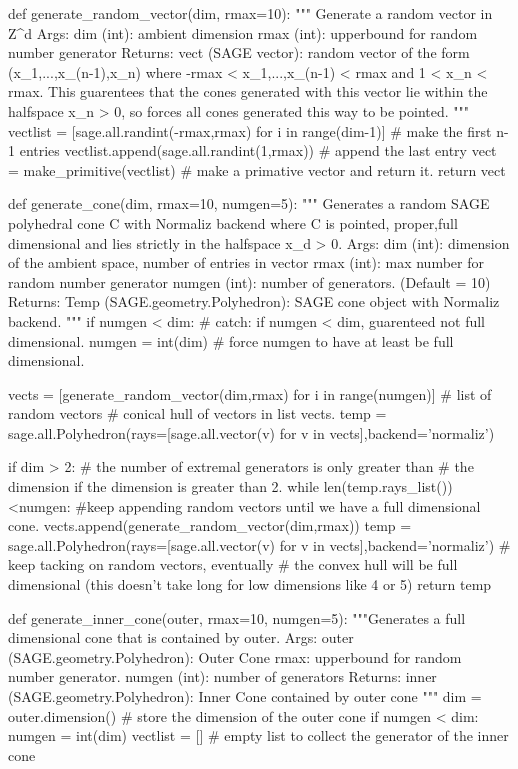 \documentclass{TC}
\begin{document}
\begin{SAGE}
def generate_random_vector(dim, rmax=10):
	""" Generate a random vector in Z^d
	Args:
		dim (int): ambient dimension
		rmax (int): upperbound for random number generator
	Returns:
		vect (SAGE vector): random vector of the form (x_1,...,x_(n-1),x_n)
		where -rmax < x_1,...,x_(n-1) < rmax
		and 1 < x_n < rmax.
		This guarentees that the cones generated with this vector lie within
		the halfspace x_n > 0, so forces all cones generated this way to be pointed.
	"""
	vectlist  = [sage.all.randint(-rmax,rmax) for i in range(dim-1)]
	# make the first n-1 entries
	vectlist.append(sage.all.randint(1,rmax))
	# append the last entry  
	vect = make_primitive(vectlist) 
	# make a primative vector and return it.
	return vect

def generate_cone(dim, rmax=10, numgen=5):
	""" Generates a random SAGE polyhedral cone C with Normaliz backend
	where C is pointed, proper,full dimensional and lies strictly in 
	the halfspace x_d > 0.
	Args:
		dim (int): dimension of the ambient space, number of entries in vector
		rmax (int): max number for random number generator
		numgen (int): number of generators. (Default = 10)
	Returns:
		Temp (SAGE.geometry.Polyhedron): SAGE cone object with Normaliz backend. 
	"""
	if numgen < dim: 			# catch: if numgen < dim, guarenteed not full dimensional. 
		numgen = int(dim)  		# force numgen to have at least be full dimensional.

	vects = [generate_random_vector(dim,rmax) for i in range(numgen)] # list of random vectors
	# conical hull of vectors in list vects.
	temp = sage.all.Polyhedron(rays=[sage.all.vector(v) for v in vects],backend='normaliz')
	
	if dim > 2:
		# the number of extremal generators is only greater than
		# the dimension if the dimension is greater than 2.
		while len(temp.rays_list())<numgen: 
			#keep appending random vectors until we have a full dimensional cone. 
			vects.append(generate_random_vector(dim,rmax))
			temp = sage.all.Polyhedron(rays=[sage.all.vector(v) for v in vects],backend='normaliz')
			# keep tacking on random vectors, eventually 
			# the convex hull will be full dimensional (this doesn't take long for low dimensions like 4 or 5)
	return temp

def generate_inner_cone(outer, rmax=10, numgen=5):
	"""Generates a full dimensional cone that is contained by outer.
	Args:
		outer (SAGE.geometry.Polyhedron): Outer Cone
		rmax: upperbound for random number generator.
		numgen (int): number of generators
	Returns:
		inner (SAGE.geometry.Polyhedron): Inner Cone contained by outer cone
	"""
	dim = outer.dimension()
	# store the dimension of the outer cone
	if numgen < dim:
		numgen = int(dim)
	vectlist = [] # empty list to collect the generator of the inner cone


\end{SAGE}
\end{document}
